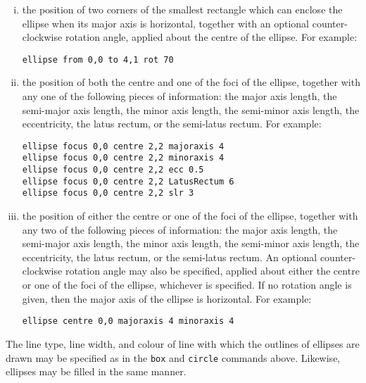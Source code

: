\begin{enumerate}[(i)]
\item the position of two corners of the smallest rectangle which can enclose
the ellipse when its major axis is horizontal, together with an optional
counter-clockwise rotation angle, applied about the centre of the ellipse.
For example:

\begin{verbatim}
ellipse from 0,0 to 4,1 rot 70
\end{verbatim}

\item the position of both the centre and one of the foci of the ellipse,
together with any one of the following pieces of information: the major axis
length, the semi-major axis length, the minor axis length, the semi-minor axis
length, the eccentricity, the latus rectum, or the semi-latus rectum.  For
example:

\begin{verbatim}
ellipse focus 0,0 centre 2,2 majoraxis 4
ellipse focus 0,0 centre 2,2 minoraxis 4
ellipse focus 0,0 centre 2,2 ecc 0.5
ellipse focus 0,0 centre 2,2 LatusRectum 6
ellipse focus 0,0 centre 2,2 slr 3
\end{verbatim}

\item the position of either the centre or one of the foci of the ellipse,
together with any two of the following pieces of information: the major axis
length, the semi-major axis length, the minor axis length, the semi-minor axis
length, the eccentricity, the latus rectum, or the semi-latus rectum. An
optional counter-clockwise rotation angle may also be specified, applied about
either the centre or one of the foci of the ellipse, whichever is specified. If
no rotation angle is given, then the major axis of the ellipse is horizontal.
For example:

\begin{verbatim}
ellipse centre 0,0 majoraxis 4 minoraxis 4
\end{verbatim}
\end{enumerate}

The line type, line width, and colour of line with which the outlines of
ellipses are drawn may be specified as in the {\tt box} and {\tt circle}
commands above. Likewise, ellipses may be filled in the same manner.

